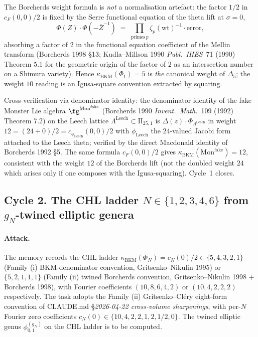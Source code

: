 The Borcherds weight formula is \emph{not} a normalisation
artefact: the factor $1/2$ in $c_F(0, 0)/2$ is fixed by the Serre
functional equation of the theta lift at $\sigma = 0$,
\[
  \Phi(Z) \cdot \Phi(-\overline{Z}^{-1}) \;=\;
    \prod_{\mathrm{primes}\, p} \zeta_p(\mathrm{wt})^{-1}
    \cdot \mathrm{error},
\]
absorbing a factor of $2$ in the functional equation coefficient
of the Mellin transform (Borcherds 1998 \S13; Kudla--Millson 1990
\emph{Publ.\ IHES}~71 (1990) Theorem 5.1 for the geometric origin
of the factor of $2$ as an intersection number on a Shimura
variety). Hence $\kappa_{\mathrm{BKM}}(\Phi_1) = 5$ is \emph{the}
canonical weight of $\Delta_5$; the weight $10$ reading is an
Igusa-square convention extracted by squaring.

Cross-verification via denominator identity: the denominator
identity of the fake Monster Lie algebra
$\fg^{\mathrm{Mon}^{\mathrm{fake}}}$ (Borcherds 1990
\emph{Invent.\ Math.}~109 (1992) Theorem 7.2) on the Leech lattice
$\Lambda^{\mathrm{Leech}} \subset \mathrm{II}_{25, 1}$ is
$\Delta(z) \cdot \Phi_{\Lambda^{\mathrm{Leech}}}$ in weight
$12 = (24 + 0)/2 = c_{\phi_{\mathrm{Leech}}}(0, 0)/2$ with
$\phi_{\mathrm{Leech}}$ the $24$-valued Jacobi form attached to
the Leech theta; verified by the direct Macdonald identity of
Borcherds 1992 \S 5. The same formula $c_F(0, 0)/2$ gives
$\kappa_{\mathrm{BKM}}(\mathrm{Mon}^{\mathrm{fake}}) = 12$,
consistent with the weight $12$ of the Borcherds lift (not the
doubled weight $24$ which arises only if one composes with the
Igusa-squaring). Cycle~1 closes.

\subsection*{Cycle 2. The CHL ladder $N \in \{1, 2, 3, 4, 6\}$
  from $g_N$-twined elliptic genera}

\paragraph{Attack.} The memory records the CHL ladder
$\kappa_{\mathrm{BKM}}(\Phi_N) = c_N(0)/2 \in \{5, 4, 3, 2, 1\}$
(Family (i) BKM-denominator convention, Gritsenko--Nikulin 1995)
or $\{5, 2, 1, 1, 1\}$ (Family (ii) twined Borcherds convention,
Gritsenko--Nikulin 1998 + Borcherds 1998), with Fourier
coefficients $(10, 8, 6, 4, 2)$ or $(10, 4, 2, 2, 2)$ respectively.
The task adopts the Family (ii) Gritsenko--Cl\'ery eight-form
convention of CLAUDE.md
\S\emph{2026-04-22 cross-volume sharpenings}, with per-$N$
Fourier zero coefficients
$c_N(0) \in \{10, 4, 2, 2, 1, 2, 1/2, 0\}$. The twined elliptic
genus $\phi^{(g_N)}_{0, 1}$ on the CHL ladder is to be computed.

